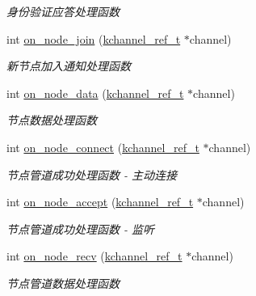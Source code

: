 \begin{DoxyCompactItemize}
\begin{DoxyCompactList}\small\item\em 身份验证应答处理函数 \end{DoxyCompactList}\item 
int \hyperlink{a00102_a97868db78a1ce888063dbd4709d2896b_a97868db78a1ce888063dbd4709d2896b}{on\+\_\+node\+\_\+join} (\hyperlink{a00066_a3b7e82599367eade261456f60ebe2cd9_a3b7e82599367eade261456f60ebe2cd9}{kchannel\+\_\+ref\+\_\+t} $\ast$channel)
\begin{DoxyCompactList}\small\item\em 新节点加入通知处理函数 \end{DoxyCompactList}\item 
int \hyperlink{a00102_a32e1b1f54cd73d3cde296efe5bc9c39a_a32e1b1f54cd73d3cde296efe5bc9c39a}{on\+\_\+node\+\_\+data} (\hyperlink{a00066_a3b7e82599367eade261456f60ebe2cd9_a3b7e82599367eade261456f60ebe2cd9}{kchannel\+\_\+ref\+\_\+t} $\ast$channel)
\begin{DoxyCompactList}\small\item\em 节点数据处理函数 \end{DoxyCompactList}\item 
int \hyperlink{a00102_a42e77e8c8913b99c23f3dab6b829b2ed_a42e77e8c8913b99c23f3dab6b829b2ed}{on\+\_\+node\+\_\+connect} (\hyperlink{a00066_a3b7e82599367eade261456f60ebe2cd9_a3b7e82599367eade261456f60ebe2cd9}{kchannel\+\_\+ref\+\_\+t} $\ast$channel)
\begin{DoxyCompactList}\small\item\em 节点管道成功处理函数 -\/ 主动连接 \end{DoxyCompactList}\item 
int \hyperlink{a00102_af2ac58191a40af414f62c9eccaeb4a5a_af2ac58191a40af414f62c9eccaeb4a5a}{on\+\_\+node\+\_\+accept} (\hyperlink{a00066_a3b7e82599367eade261456f60ebe2cd9_a3b7e82599367eade261456f60ebe2cd9}{kchannel\+\_\+ref\+\_\+t} $\ast$channel)
\begin{DoxyCompactList}\small\item\em 节点管道成功处理函数 -\/ 监听 \end{DoxyCompactList}\item 
int \hyperlink{a00102_afaaf2440e99559696a2376e6d43377b8_afaaf2440e99559696a2376e6d43377b8}{on\+\_\+node\+\_\+recv} (\hyperlink{a00066_a3b7e82599367eade261456f60ebe2cd9_a3b7e82599367eade261456f60ebe2cd9}{kchannel\+\_\+ref\+\_\+t} $\ast$channel)
\begin{DoxyCompactList}\small\item\em 节点管道数据处理函数 \end{DoxyCompactList}\item 

\end{DoxyCompactItemize}
